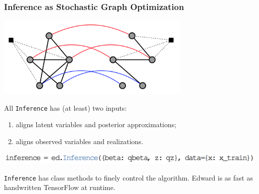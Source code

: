 \documentclass[10pt,
               xcolor={usenames,dvipsnames},
               hyperref={colorlinks,linktoc=all,citecolor=Plum,linkcolor=MidnightBlue,urlcolor=MidnightBlue},noamssymb]{beamer}
\begin{document}
\begin{frame}
\frametitle{Inference as Stochastic Graph Optimization}

\begin{center}
\includegraphics[width=0.7\textwidth]{img/inference-graph.png}
\end{center}

All \texttt{Inference} has (at least) two inputs: \\
\begin{enumerate}
\vspace{-3ex}
\item
{} aligns latent variables and posterior approximations;
\item
{} aligns observed variables and realizations.
\end{enumerate}

\begin{center}
\vspace{-2.0ex}
\includegraphics[height=0.05\textheight]{img/inference.png}
\end{center}

\texttt{Inference} has class methods to finely control the algorithm.
Edward is as fast as handwritten TensorFlow at runtime.
\end{frame}
\end{document}
